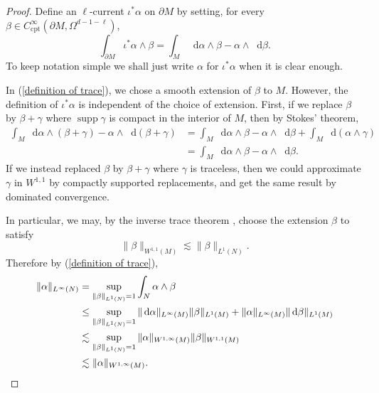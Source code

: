 \documentclass[reqno,11pt]{amsart}
\newcommand*\dif{\mathop{}\!\mathrm{d}}
\DeclareMathOperator{\supp}{supp}
\newcommand{\cpt}{\mathrm{cpt}}
\theoremstyle{definition}
\numberwithin{equation}{section}
\begin{document}
\begin{proof}
Define an $\ell$-current $\iota^* \alpha$ on $\partial M$ by setting, for every $\beta \in C^\infty_\cpt(\partial M, \Omega^{d - 1 - \ell})$,
\begin{equation}\label{definition of trace}
\int_{\partial M} \iota^* \alpha \wedge \beta = \int_M \dif \alpha \wedge \beta - \alpha \wedge \dif \beta.
\end{equation}
To keep notation simple we shall just write $\alpha$ for $\iota^* \alpha$ when it is clear enough.

In (\ref{definition of trace}), we chose a smooth extension of $\beta$ to $M$.
However, the definition of $\iota^* \alpha$ is independent of the choice of extension.
First, if we replace $\beta$ by $\beta + \gamma$ where $\supp \gamma$ is compact in the interior of $M$, then by Stokes' theorem,
\begin{align*}
\int_M \dif \alpha \wedge (\beta + \gamma) - \alpha \wedge \dif (\beta + \gamma)
&= \int_M \dif \alpha \wedge \beta - \alpha \wedge \dif \beta + \int_M \dif(\alpha \wedge \gamma) \\
&= \int_M \dif \alpha \wedge \beta - \alpha \wedge \dif \beta.
\end{align*}
If we instead replaced $\beta$ by $\beta + \gamma$ where $\gamma$ is traceless, then we could approximate $\gamma$ in $W^{1, 1}$ by compactly supported replacements, and get the same result by dominated convergence.

In particular, we may, by the inverse trace theorem \cite[Teorema 1.II]{Gagliardo1957}, choose the extension $\beta$ to satisfy 
$$\|\beta\|_{W^{1, 1}(M)} \lesssim \|\beta\|_{L^1(N)}.$$
Therefore by (\ref{definition of trace}), 
\begin{align*}
\|\alpha\|_{L^\infty(N)} 
&= \sup_{\|\beta\|_{L^1(N)} = 1} \int_N \alpha \wedge \beta\\
&\leq \sup_{\|\beta\|_{L^1(N)} = 1} \|\dif \alpha\|_{L^\infty(M)} \|\beta\|_{L^1(M)} + \|\alpha\|_{L^\infty(M)} \|\dif \beta\|_{L^1(M)} \\
&\lesssim \sup_{\|\beta\|_{L^1(N)} = 1} \|\alpha\|_{W^{1, \infty}(M)} \|\beta\|_{W^{1, 1}(M)} \\
&\lesssim \|\alpha\|_{W^{1, \infty}(M)}. \qedhere
\end{align*}
\end{proof}
\end{document}
